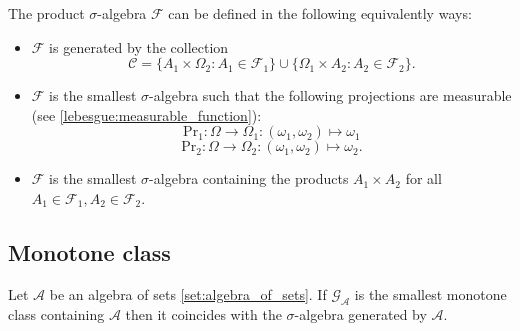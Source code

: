     \begin{construct}\label{set:product_of_sigma_algebras}
        The product $\sigma$-algebra $\mathcal{F}$ can be defined in the following equivalently ways:
        \begin{itemize}
            \item $\mathcal{F}$ is generated by the collection
                \[\mathcal{C} = \{A_1\times \Omega_2:A_1\in\mathcal{F}_1\}\cup\{\Omega_1\times A_2:A_2\in\mathcal{F}_2\}.\]
            \item $\mathcal{F}$ is the smallest $\sigma$-algebra such that the following projections are measurable (see \ref{lebesgue:measurable_function}):
                \[\text{Pr}_1:\Omega\rightarrow\Omega_1:(\omega_1,\omega_2)\mapsto\omega_1\]
                \[\text{Pr}_2:\Omega\rightarrow\Omega_2:(\omega_1,\omega_2)\mapsto\omega_2.\]
            \item $\mathcal{F}$ is the smallest $\sigma$-algebra containing the products $A_1\times A_2$ for all $A_1\in\mathcal{F}_1, A_2\in\mathcal{F}_2$.
        \end{itemize}
    \end{construct}

\subsection{Monotone class}


    \begin{theorem}\label{set:theorem:monotone_class}
        Let $\mathcal{A}$ be an algebra of sets \ref{set:algebra_of_sets}. If $\mathcal{G}_\mathcal{A}$ is the smallest monotone class containing $\mathcal{A}$ then it coincides with the $\sigma$-algebra generated by $\mathcal{A}$.
    \end{theorem}


